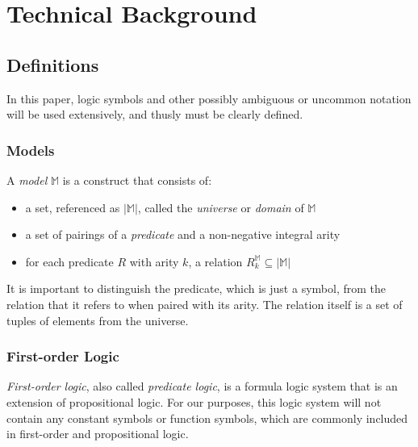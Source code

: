 \section{Technical Background}

	\subsection{Definitions}

	In this paper, logic symbols and other possibly ambiguous or uncommon
	notation will be used extensively, and thusly must be clearly defined.

		\subsubsection{Models}

		A \emph{model} $\mathbb{M}$ is a construct that consists of:
		\begin{itemize}
		\item a set, referenced as $|\mathbb{M}|$, called the \emph{universe} or \emph{domain} of $\mathbb{M}$
		\item a set of pairings of a \emph{predicate} and a non-negative integral arity
		\item for each predicate $R$ with arity $k$, a relation $R^\mathbb{M}_k \subseteq |\mathbb{M}|$
		\end{itemize}
		It is important to distinguish the predicate, which is just a symbol,
		from the relation that it refers to when paired with its arity. The
		relation itself is a set of tuples of elements from the universe.

		\subsubsection{First-order Logic}

		\emph{First-order logic}, also called \emph{predicate logic}, is a
		formula logic system that is an extension of propositional logic. For
		our purposes, this logic system will not contain any constant symbols
		or function symbols, which are commonly included in first-order and
		propositional logic.

